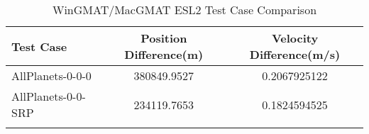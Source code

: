 \begin{table}[htbp!]
\centering
\caption{ WinGMAT/MacGMAT ESL2 Test Case Comparison}
      \begin{tabular}{lcc}
      \hline\hline
          Test Case & Position Difference(m) & Velocity Difference(m/s) \\
         \hline
         AllPlanets-0-0-0 & 380849.9527 & 0.2067925122 \\
         AllPlanets-0-0-SRP & 234119.7653 & 0.1824594525 \\
      \hline\hline
      \label{Table: ESL2 WinGMAT-MacGMAT Table} 
\end{tabular}
\end{table}
